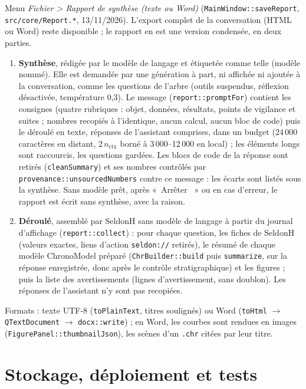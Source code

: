 \documentclass[11pt,a4paper]{article}
\providecommand{\og}{«~}\providecommand{\fg}{\unskip~»}
\newcommand{\code}[1]{\texttt{\small #1}}
\begin{document}
Menu \emph{Fichier > Rapport de synthèse (texte ou Word)} (\code{MainWindow::saveReport}, \code{src/core/Report.*},
13/11/2026). L'export complet de la conversation (HTML ou Word) reste disponible ; le rapport en est une version
condensée, en deux parties.
\begin{enumerate}[leftmargin=*]
\item \textbf{Synthèse}, rédigée par le modèle de langage et étiquetée comme telle (modèle nommé). Elle est demandée par
  une génération à part, ni affichée ni ajoutée à la conversation, comme les questions de l'arbre (outils suspendus,
  réflexion désactivée, température 0,3). Le message (\code{report::promptFor}) contient les consignes (quatre
  rubriques : objet, données, résultats, points de vigilance et suites ; nombres recopiés à l'identique, aucun calcul,
  aucun bloc de code) puis le déroulé en texte, réponses de l'assistant comprises, dans un budget (24\,000 caractères en
  distant, $2\,n_{\text{ctx}}$ borné à 3\,000--12\,000 en local) ; les éléments longs sont raccourcis, les questions
  gardées. Les blocs de code de la réponse sont retirés (\code{cleanSummary}) et ses nombres contrôlés par
  \code{provenance::unsourcedNumbers} contre ce message : les écarts sont listés sous la synthèse. Sans modèle prêt,
  après \og Arrêter \fg{} ou en cas d'erreur, le rapport est écrit sans synthèse, avec la raison.
\item \textbf{Déroulé}, assemblé par SeldonH sans modèle de langage à partir du journal d'affichage
  (\code{report::collect}) : pour chaque question, les fiches de SeldonH (valeurs exactes, liens d'action
  \code{seldon://} retirés), le résumé de chaque modèle ChronoModel préparé (\code{ChrBuilder::build} puis
  \code{summarize}, sur la réponse enregistrée, donc après le contrôle stratigraphique) et les figures ; puis la liste
  des avertissements (lignes d'avertissement, sans doublon). Les réponses de l'assistant n'y sont pas recopiées.
\end{enumerate}
Formats : texte UTF-8 (\code{toPlainText}, titres soulignés) ou Word (\code{toHtml} $\to$ \code{QTextDocument} $\to$
\code{docx::write}) ; en Word, les courbes sont rendues en images (\code{FigurePanel::thumbnailJson}), les scènes d'un
\code{.chr} citées par leur titre.

\section{Stockage, déploiement et tests}
\end{document}

